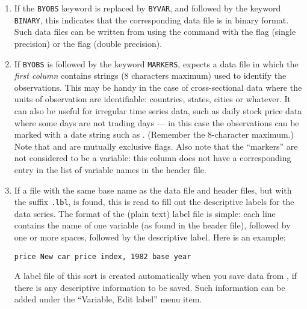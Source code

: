 \begin{enumerate}
\item If the \verb+BYOBS+ keyword is replaced by \verb+BYVAR+, and
  followed by the keyword \verb+BINARY+, this indicates that the
  corresponding data file is in binary format.  Such data files can be
  written from  using the  command with the
   flag (single precision) or the  flag (double
  precision).


\item If \verb+BYOBS+ is followed by the keyword \verb+MARKERS+,
   expects a data file in which the \emph{first column}
  contains strings (8 characters maximum) used to identify the
  observations.  This may be handy in the case of cross-sectional data
  where the units of observation are identifiable: countries, states,
  cities or whatever.  It can also be useful for irregular time series
  data, such as daily stock price data where some days are not trading
  days --- in this case the observations can be marked with a date
  string such as .  (Remember the 8-character maximum.)
  Note that  and  are mutually exclusive
  flags. Also note that the ``markers'' are not considered to be a
  variable: this column does not have a corresponding entry in the
  list of variable names in the header file.


\item If a file with the same base name as the data file and header
  files, but with the suffix \verb+.lbl+, is found, this is read to
  fill out the descriptive labels for the data series. The format of
  the (plain text) label file is simple: each line contains the name
  of one variable (as found in the header file), followed by one or
  more spaces, followed by the descriptive label. Here is an example:

  \verb+price New car price index, 1982 base year+

  A label file of this sort is created automatically when you save
  data from , if there is any descriptive information to be
  saved.  Such information can be added under the ``Variable, Edit
  label'' menu item.
	  


\end{enumerate}

